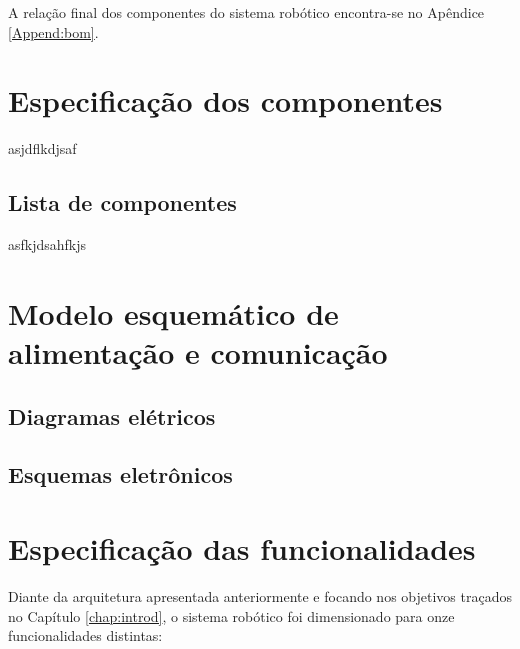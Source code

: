 
A relação final dos componentes do sistema robótico encontra-se no Apêndice \ref{Append:bom}.

\section{Especificação dos componentes}
\label{sec:espc}
asjdflkdjsaf




\subsection{Lista de componentes}
\label{ssec:list}
asfkjdsahfkjs





\section{Modelo esquemático de alimentação e comunicação}
\label{sec:modesq}


\subsection{Diagramas elétricos}
\label{sec:diage}

\subsection{Esquemas eletrônicos}
\label{ssec:esqe}


\section{Especificação das funcionalidades}
\label{sec:espf}
Diante da arquitetura apresentada anteriormente e focando nos objetivos traçados no Capítulo \ref{chap:introd}, o sistema robótico foi dimensionado para onze funcionalidades distintas:

